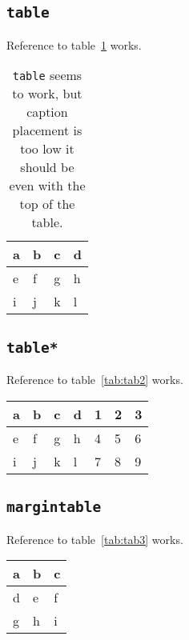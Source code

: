 \documentclass[nols]{tufte-handout}
\begin{document}
\subsection{\texttt{table}}
Reference to table~\ref{tab:tab1} works.
\begin{table}[h]
\begin{center}
\begin{tabular}{llll}
\toprule
a & b & c & d \\
\midrule
e & f & g & h \\
i & j & k & l \\
\bottomrule
\end{tabular}
\end{center}
\caption{\texttt{table} seems to work, but caption placement is too low it should be even with the top of the table.}
\label{tab:tab1}
\end{table}

\subsection{\texttt{table*}}
Reference to table~\ref{tab:tab2} works.
\begin{table*}[h]
\begin{center}
\begin{tabular}{lllllll}
\toprule
a & b & c & d & 1 & 2 & 3\\
\midrule
e & f & g & h & 4 & 5 & 6\\
i & j & k & l & 7 & 8 & 9\\
\bottomrule
\end{tabular}
\end{center}
\caption{\texttt{table*} also seems to work?}
\label{tab:tab2}
\end{table*}

\subsection{\texttt{margintable}}
Reference to table~\ref{tab:tab3} works.
\begin{margintable}
\begin{center}
\begin{tabular}{lll}
\toprule
a & b & c \\
\midrule
d & e & f \\
g & h & i \\
\bottomrule
\end{tabular}
\end{center}
\caption{\texttt{margintable} here, seems to work right.}
\label{tab:tab3}
\end{margintable}
\end{document}
